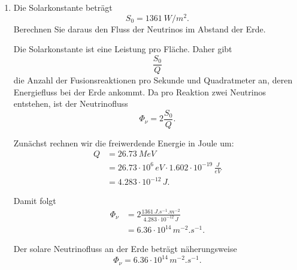 \documentclass[11pt,a4paper]{scrartcl}
\begin{document}
    \begin{enumerate}[label=(\alph*)]
        \item
            Die Solarkonstante beträgt
            \[
                S_0=\SI{1361}{W/m^2}.
            \]
            Berechnen Sie daraus den Fluss der Neutrinos im Abstand der Erde.

            \begin{calculationbox}
                Die Solarkonstante ist eine Leistung pro Fläche. Daher gibt
                \[
                    \frac{S_0}{Q}
                \]
                die Anzahl der Fusionsreaktionen pro Sekunde und Quadratmeter an,
                deren Energiefluss bei der Erde ankommt. Da pro Reaktion zwei Neutrinos
                entstehen, ist der Neutrinofluss
                \[
                    \Phi_\nu=2\frac{S_0}{Q}.
                \]

                \begin{calculationbox}
                    Zunächst rechnen wir die freiwerdende Energie in Joule um:
                    \begin{align*}
                        Q&=\SI{26.73}{MeV}\\
                        &=26.73\cdot10^6\,\si{eV}\cdot1.602\cdot10^{-19}\,\frac{\si{J}}{\si{eV}}\\
                        &=4.283\cdot10^{-12}\,\si{J}.
                    \end{align*}
                \end{calculationbox}

                \begin{calculationbox}
                    Damit folgt
                    \begin{align*}
                        \Phi_\nu
                        &=2\frac{1361\,\si{J.s^{-1}.m^{-2}}}{4.283\cdot10^{-12}\,\si{J}}\\
                        &=6.36\cdot10^{14}\,\si{m^{-2}.s^{-1}}.
                    \end{align*}
                \end{calculationbox}
            \end{calculationbox}

            \begin{answerbox}
                Der solare Neutrinofluss an der Erde beträgt näherungsweise
                \[
                    \boxed{\Phi_\nu=6.36\cdot10^{14}\,\si{m^{-2}.s^{-1}}.}
                \]
            \end{answerbox}


\end{enumerate}
\end{document}
